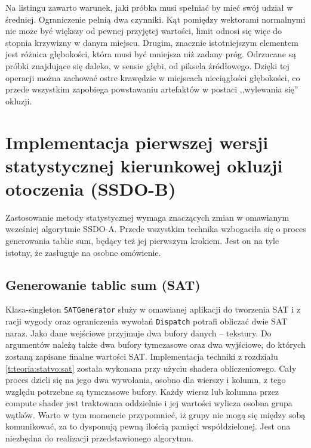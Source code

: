 		Na listingu zawarto warunek, jaki próbka musi spełniać by mieć swój udział w średniej. Ograniczenie pełnią dwa czynniki. Kąt pomiędzy wektorami normalnymi nie może być większy od pewnej przyjętej wartości, limit odnosi się więc do stopnia krzywizny w danym miejscu. Drugim, znacznie istotniejszym elementem jest różnica głębokości, która musi być mniejsza niż zadany próg. Odrzucane są próbki znajdujące się daleko, w sensie głębi, od piksela źródłowego. Dzięki tej operacji można zachować ostre krawędzie w miejscach nieciągłości głębokości, co przede wszystkim zapobiega powstawaniu artefaktów w postaci ,,wylewania się'' okluzji.
	
	\section{Implementacja pierwszej wersji statystycznej kierunkowej okluzji otoczenia (SSDO-B)}
	\label{t:impl:b}
	
	
	
	Zastosowanie metody statystycznej wymaga znaczących zmian w omawianym wcześniej algorytmie SSDO-A. Przede wszystkim technika wzbogaciła się o proces generowania tablic sum, będący też jej pierwszym krokiem. Jest on na tyle istotny, że zasługuje na osobne omówienie.
	
	\subsection{Generowanie tablic sum (SAT)}
	\label{t:impl:b:sat}
	
		Klasa-singleton \texttt{SATGenerator} służy w omawianej aplikacji do tworzenia SAT i z racji wygody oraz ograniczenia wywołań \texttt{Dispatch} potrafi obliczać dwie SAT naraz. Jako dane wejściowe przyjmuje dwa bufory danych -- tekstury. Do argumentów należą także dwa bufory tymczasowe oraz dwa wyjściowe, do których zostaną zapisane finalne wartości SAT. Implementacja techniki z rozdziału \ref{t:teoria:statvo:sat} została wykonana przy użyciu shadera obliczeniowego. Cały proces dzieli się na jego dwa wywołania, osobno dla wierszy i kolumn, z tego względu potrzebne są tymczasowe bufory. Każdy wiersz lub kolumna przez compute shader jest traktowana oddzielnie i jej wartości wylicza osobna grupa wątków. Warto w tym momencie przypomnieć, iż grupy nie mogą się między sobą komunikować, za to dysponują pewną ilością pamięci współdzielonej. Jest ona niezbędna do realizacji przedstawionego algorytmu. 
		
